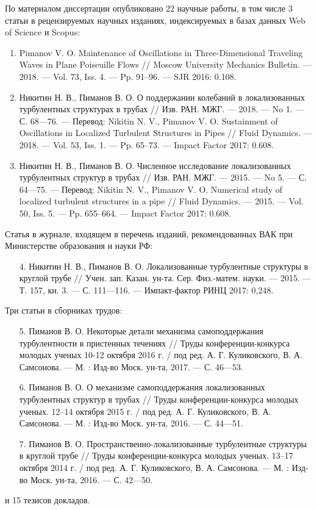 По материалом диссертации опубликовано 22 научные работы, в том числе 3 статьи в рецензируемых научных изданиях, индексируемых в базах данных Web of Science и Scopus:
\begin{enumerate}
\item Pimanov V. O. Maintenance of Oscillations in Three-Dimensional Traveling Waves in Plane Poiseuille Flows // Moscow University Mechanics Bulletin. —
2018. — Vol. 73, Iss. 4. — Pp. 91–96. — SJR 2016: 0.108.
\item Никитин Н. В., Пиманов В. О. О поддержании колебаний в локализованных турбулентных структурах в трубах // Изв. РАН. МЖГ. — 2018. — No 1. — С. 68—76. — Перевод: Nikitin N. V., Pimanov V. O. Sustainment of Oscillations in Localized Turbulent Structures in Pipes // Fluid Dynamics. — 2018. — Vol. 53, Iss. 1. — Pp. 65–73. — Impact Factor 2017: 0.608.
\item Никитин Н. В., Пиманов В. О. Численное исследование локализованных турбулентных структур в трубах // Изв. РАН. МЖГ. — 2015. — No 5. — С. 64—75. — Перевод: Nikitin N. V., Pimanov V. O. Numerical study of localized turbulent structures in a pipe // Fluid Dynamics. — 2015. — Vol. 50, Iss. 5. — Pp. 655–664. — Impact Factor 2017: 0.608.
\end{enumerate}
Статья в журнале, входящем в перечень изданий, рекомендованных ВАК при Министерстве образования и науки РФ:
\begin{enumerate}
\item[4.] Никитин Н. В., Пиманов В. О. Локализованные турбулентные структуры в круглой трубе // Учен. зап. Казан. ун-та. Сер. Физ.-матем. науки. —
2015. — Т. 157, кн. 3. — С. 111—116. — Импакт-фактор РИНЦ 2017: 0,248.
\end{enumerate}
Три статьи в сборниках трудов:
\begin{enumerate}
\item[5.] Пиманов В. О. Некоторые детали механизма самоподдержания турбулентности в пристенных течениях // Труды конференции-конкурса молодых
ученых 10-12 октября 2016 г. / под ред. А. Г. Куликовского, В. А. Самсонова. — М. : Изд-во Моск. ун-та, 2017. — С. 46—53.
\item[6.] Пиманов В. О. О механизме самоподдержания локализованных турбулентных структур в трубах // Труды конференции-конкурса молодых ученых. 12–14 октября 2015 г. / под ред. А. Г. Куликовского, В. А. Самсонова. — М. : Изд-во Моск. ун-та, 2016. — С. 44—51.
\item[7.] Пиманов В. О. Пространственно-локализованные турбулентные структуры в круглой трубе // Труды конференции-конкурса молодых ученых. 13–17 октября 2014 г. / под ред. А. Г. Куликовского, В. А. Самсонова. — М. : Изд-во Моск. ун-та, 2016. — С. 42—50.
\end{enumerate} 
и 15 тезисов докладов.

